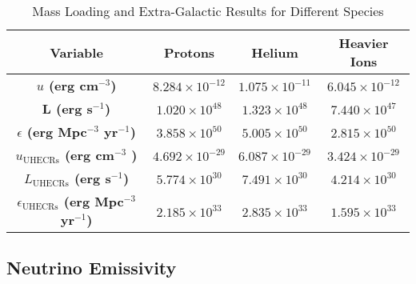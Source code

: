  \begin{table}[h!]
    \centering
    \begin{tabular}{|c|c|c|c|}
    \hline
    \textbf{Variable} & \textbf{Protons} & \textbf{Helium} & \textbf{Heavier Ions} \\
    \hline
    \textbf{$u$ (erg cm$^{-3}$)} & \(8.284 \times 10^{-12}\) & \(1.075 \times 10^{-11}\) & \(6.045 \times 10^{-12}\) \\
    \hline
    \textbf{L (erg s$^{-1}$)} & \(1.020 \times 10^{48}\) & \(1.323 \times 10^{48}\) & \(7.440 \times 10^{47}\) \\
    \hline
    \textbf{$\epsilon$ (erg Mpc$^{-3}$ yr$^{-1}$)} & \(3.858 \times 10^{50}\) & \(5.005 \times 10^{50}\) & \(2.815 \times 10^{50}\) \\
    \hline
    \textbf{$u_{\text{UHECRs}}$ (erg cm$^{-3}$ )} & \(4.692 \times 10^{-29}\) & \(6.087 \times 10^{-29}\) & \(3.424 \times 10^{-29}\) \\
    \hline
    \textbf{$L_{\text{UHECRs}}$ (erg s$^{-1}$)} & \(5.774 \times 10^{30}\) & \(7.491 \times 10^{30}\) & \(4.214 \times 10^{30}\) \\
    \hline
    \textbf{$\epsilon_{\text{UHECRs}}$  (erg Mpc$^{-3}$ yr$^{-1}$)} & \(2.185 \times 10^{33}\) & \(2.835 \times 10^{33}\) & \(1.595 \times 10^{33}\) \\
    \hline
    \end{tabular}
    \caption{Mass Loading and Extra-Galactic Results for Different Species}
    \label{tab:emissivity_mass_load}
    \end{table}
 


\subsection{Neutrino Emissivity}
